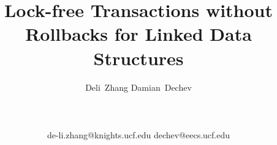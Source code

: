 \documentclass[]{sig-alternate-05-2015}
\begin{document}
\title{Lock-free Transactions without Rollbacks for Linked Data Structures}



\author{
    \alignauthor
    Deli~Zhang \hspace{14pt} Damian~Dechev\\
    \\
    \\
     \\
    de-li.zhang@knights.ucf.edu  dechev@eecs.ucf.edu
}

\maketitle
\end{document}
